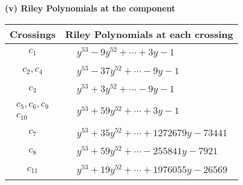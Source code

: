 \documentclass[1p]{elsarticle_modified}
\theoremstyle{definition}
\begin{document}
\newpage\renewcommand{\arraystretch}{1}
\flushleft \textbf{(v) Riley Polynomials at the component}\newline \\
\begin{tabular}{m{50pt}|m{274pt}}
Crossings & \hspace{64pt}Riley Polynomials at each crossing \\
\hline $$\begin{aligned}c_{1}\end{aligned}$$&$\begin{aligned}
&y^{53}-9 y^{52}+\cdots+3 y-1
\end{aligned}$\\
\hline $$\begin{aligned}c_{2},c_{4}\end{aligned}$$&$\begin{aligned}
&y^{53}-37 y^{52}+\cdots-9 y-1
\end{aligned}$\\
\hline $$\begin{aligned}c_{3}\end{aligned}$$&$\begin{aligned}
&y^{53}+3 y^{52}+\cdots-9 y-1
\end{aligned}$\\
\hline $$\begin{aligned}c_{5},c_{6},c_{9}\\c_{10}\end{aligned}$$&$\begin{aligned}
&y^{53}+59 y^{52}+\cdots+3 y-1
\end{aligned}$\\
\hline $$\begin{aligned}c_{7}\end{aligned}$$&$\begin{aligned}
&y^{53}+35 y^{52}+\cdots+1272679 y-73441
\end{aligned}$\\
\hline $$\begin{aligned}c_{8}\end{aligned}$$&$\begin{aligned}
&y^{53}+59 y^{52}+\cdots-255841 y-7921
\end{aligned}$\\
\hline $$\begin{aligned}c_{11}\end{aligned}$$&$\begin{aligned}
&y^{53}+19 y^{52}+\cdots+1976055 y-26569
\end{aligned}$\\
\hline
\end{tabular}\\~\\
\end{document}
